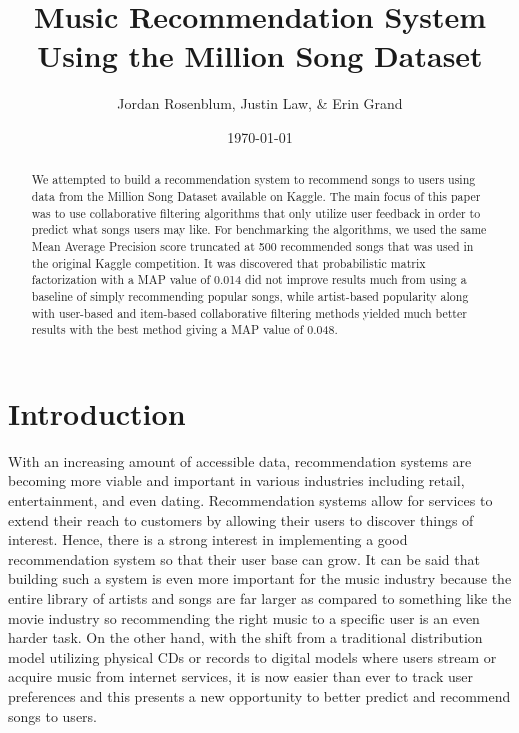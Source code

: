 \documentclass[11pt,preprint]{aastex}
\begin{document}
\title{Music Recommendation System Using the Million Song Dataset}

 \author{Jordan Rosenblum, Justin Law, \& Erin Grand}
 
\date{\today}             

\begin{abstract}
We attempted to build a recommendation system to recommend songs to users using data from the Million Song Dataset available on Kaggle. The main focus of this paper was to use collaborative filtering algorithms that only utilize user feedback in order to predict what songs users may like. For benchmarking the algorithms, we used the same Mean Average Precision score truncated at 500 recommended songs that was used in the original Kaggle competition. It was discovered that probabilistic matrix factorization with a MAP value of 0.014 did not improve results much from using a baseline of simply recommending popular songs, while artist-based popularity along with user-based and item-based collaborative filtering methods yielded much better results with the best method giving a MAP value of 0.048.

\end{abstract}

\tableofcontents

\section{Introduction}
With an increasing amount of accessible data, recommendation systems are becoming more viable and important in various industries including retail, entertainment, and even dating. Recommendation systems allow for services to extend their reach to customers by allowing their users to discover things of interest. Hence, there is a strong interest in implementing a good recommendation system so that their user base can grow. It can be said that building such a system is even more important for the music industry because the entire library of artists and songs are far larger as compared to something like the movie industry so recommending the right music to a specific user is an even harder task. On the other hand, with the shift from a traditional distribution model utilizing physical CDs or records to digital models where users stream or acquire music from internet services, it is now easier than ever to track user preferences and this presents a new opportunity to better predict and recommend songs to users.
\end{document}
